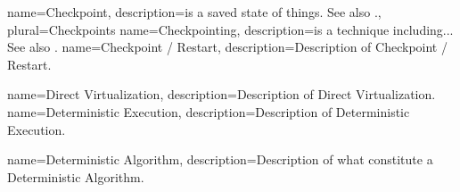 
\newcommand{\dvttermapi}{\dvtcmdabbrev{dvtglossapi}}
\newcommand{\dvttermabi}{\dvtcmdabbrev{dvtglossabi}}
\newcommand{\dvttermandroid}{Android}
\newcommand{\dvttermandroidsdk}{\dvttermandroid\ SDK}
\newcommand{\dvttermacm}{ACM}


{
  name=Checkpoint,
  description={is a saved state of things. See also \dvttermcheckpointing .},
  plural=Checkpoints
}
\newcommand{\dvttermcheckpoint}{\dvtcmdcaponce{Checkpoint}}
{
  name=Checkpointing,
  description={is a technique including... See also \dvttermcheckpoint .}
}
\newcommand{\dvttermcheckpointing}{\dvtcmdcaponcegloss{dvtglosscheckpointing}{Checkpointing}}
\newcommand{\dvttermcpu}{\dvtcmdabbrev{dvtglosscpu}}
{
  name=Checkpoint / Restart,
  description={Description of Checkpoint / Restart.}
}
\newcommand{\dvttermcheckpointrestart}{\dvtcmdcaponcegloss{dvtglosscheckpointrestart}{Checkpoint / Restart}}
\newcommand{\dvttermcuda}{CUDA}

{
  name=Direct Virtualization,
  description={Description of Direct Virtualization.}
}
\newcommand{\dvttermdirectvirtualization}{\dvtcmdcaponcegloss{dvtglossdirectvirtualization}{Direct Virtualization}}
\newcommand{\dvttermdirectx}{DirectX}
{
  name=Deterministic Execution,
  description={Description of Deterministic Execution.}
}
\newcommand{\dvttermdeterministicexecution}{\dvtcmdcaponcegloss{dvtglossdeterministicexecution}{Deterministic Execution}}

{
  name=Deterministic Algorithm,
  description={Description of what constitute a Deterministic Algorithm.}
}
\newcommand{\dvttermdeterministicalgorithm}{\dvtcmdcaponcegloss{dvtglossdeterministicalgorithm}{Deterministic Algorithm}}

